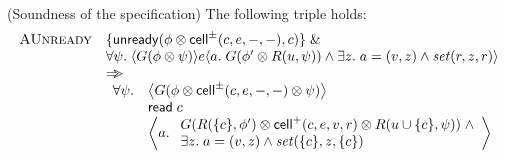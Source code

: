 \begin{prop*}{(Soundness of the  specification)}
The following triple holds:
\begin{displaymath}
\begin{array}{ll}
\mbox{\textsc{AUnready}} & 
  \{{\mathsf{unready}({\phi \otimes \mathsf{cell}^{\pm}({c}, {e}, {-}, {-})}, {c})}\} \;\&\; \\
& \forall \psi.\; \langle{G(\phi \otimes \psi)}\rangle{e}\langle{a}.\;{G(\phi' \otimes R(u, \psi)) \land \exists z.\; a = (v, z) \land \mathit{set}(r, z, r)}\rangle \\
& \Rightarrow\!\!\!> \\
& \begin{array}{ll}
   \forall \psi. & \left<G(\phi \otimes \mathsf{cell}^{\pm}({c}, {e}, {-}, {-}) \otimes \psi)\right> \\
                 & \mathsf{read}\; c \\
                 & \left<a.\; 
                     \begin{array}{l}
                       G(R(\{{c}\}, \phi') \otimes \mathsf{cell}^{+}({c}, {e}, {v}, {r}) \otimes R(u \cup \{{c}\}, \psi)) 
                        \;\land \\
                        \exists z.\;a = (v, z) \land \mathit{set}(\{{c}\}, z, \{{c}\})
                     \end{array}\right> 
  \end{array}
\end{array}
\end{displaymath}
\end{prop*}

